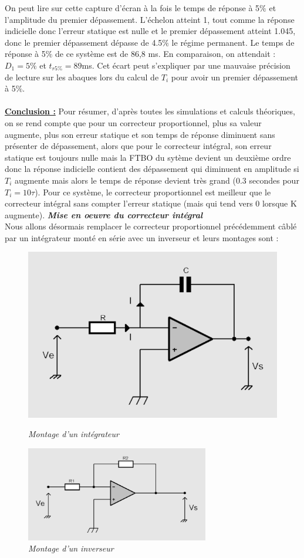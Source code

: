 \documentclass[12pt]{article}
\begin{document}
On peut lire sur cette capture d'écran à la fois le temps de réponse à 5$\%$ et l'amplitude du premier dépassement. L'échelon atteint 1, tout comme la réponse indicielle donc l'erreur statique est nulle et le premier dépassement atteint 1.045, donc le premier dépassement dépasse de 4.5$\%$ le régime permanent. Le temps de réponse à 5$\%$ de ce système est de 86,8 ms.
En comparaison, on attendait : $D_1 = 5\%$ et $t_{r5\%} = 89$ms. Cet écart peut s'expliquer par une mauvaise précision de lecture sur les abaques lors du calcul de $T_i$ pour avoir un premier dépassement à 5$\%$.
\\\\\underline{\bf Conclusion :} Pour résumer, d'après toutes les simulations et calculs théoriques, on se rend compte que pour un correcteur proportionnel, plus sa valeur augmente, plus son erreur statique et son temps de réponse diminuent sans présenter de dépassement, alors que pour le correcteur intégral, son erreur statique est toujours nulle mais la FTBO du sytème devient un deuxième ordre donc la réponse indicielle contient des dépassement qui diminuent en amplitude si $T_i$ augmente mais alors le temps de réponse devient très grand (0.3 secondes pour $T_i = 10\tau$). Pour ce système, le correcteur proportionnel est meilleur que le correcteur intégral sans compter l'erreur statique (mais qui tend vers 0 lorsque K augmente). 
\newpage \Large \textit{\textbf{Mise en oeuvre du correcteur intégral}}
\\Nous allons désormais remplacer le correcteur proportionnel précédemment câblé par un intégrateur monté en série avec un inverseur et leurs montages sont :
\begin{figure}[!ht]
    \centering
    \includegraphics[width = 8 cm]{TP3/integrateur.png}
    \caption{\itshape Montage d'un intégrateur}
    \includegraphics[width = 8cm]{TP3/inverseur.png}
    \caption{\itshape Montage d'un inverseur}
\end{figure}
\end{document}
